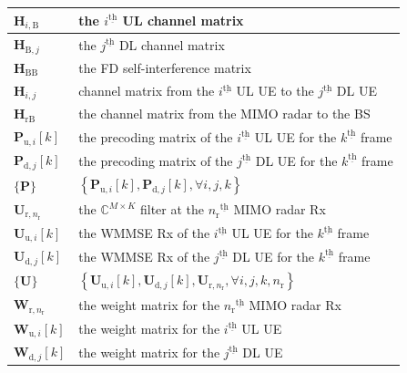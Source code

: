 \documentclass[10pt,journal]{IEEEtran}
\newcommand{\bracket}[1]{{\left [{#1}\right ]}}
\newcommand{\braces}[1]{{\left\{ {#1}\right\}}}
\newcommand{\ith}[1]    {{#1}^{\underline{\text{th}}}}
\newcommand{\rr}{_\mathrm{r}}
\newcommand{\rnr}{_{\mathrm{r},n_\mathrm{r}}}
\newcommand{\MM}{\mathit{M}}
\newcommand{\PiB}{\mathbf{P}_{\textrm{u},i}\bracket{k}}
\newcommand{\PBj}{\mathbf{P}_{\textrm{d},j}\bracket{k}}
\newcommand{\UiB}{\mathbf{U}_{\textrm{u},i}\bracket{k}}
\newcommand{\WiB}{\mathbf{W}_{\textrm{u},i}\bracket{k}}
\newcommand{\UBj}{\mathbf{U}_{\textrm{d},j}\bracket{k}}
\newcommand{\WBj}{\mathbf{W}_{\mathrm{d},j}\bracket{k}}
\newcommand{\Wrnr}{\mathbf{W}_{\mathrm{r},n_\mathrm{r}}}
\newcommand{\HrB}{\mathbf{H}_{\textrm{rB}}}
\newcommand{\HBj}{\mathbf{H}_{\textrm{B},j}}
\newcommand{\HBB}{\mathbf{H}_{\mathrm{BB}}}
\newcommand{\HiB}{\mathbf{H}_{i,\textrm{B}}}
\newcommand{\Hij}{\mathbf{H}_{i,j}}
\theoremstyle{definition}
\begin{document}
\begin{table}[!t]
\begin{tabular}{l||p{66mm}}
			\hline
			$\HiB$& the $\ith{i}$ UL channel matrix\\
			\hline
			$\HBj$& the $\ith{j}$ DL channel matrix\\
			\hline
			$\HBB$& the FD self-interference matrix\\
			\hline
			$\Hij$& channel matrix from the $\ith{i}$ UL UE to the $\ith{j}$ DL UE\\
			\hline
			$\HrB$& the channel matrix from the MIMO radar to the BS\\
			\hline
			$\PiB$& the precoding matrix of the $\ith{i}$ UL UE for the $\ith{k}$ frame\\
			\hline
			$\PBj$& the precoding matrix of the $\ith{j}$ DL UE for the $\ith{k}$ frame\\
			\hline
			$\{\mathbf{P}\}$& $\braces{\PiB,\PBj,\forall i,j,k}$\\
			\hline
			$\mathbf{U}_{\mathrm{r},n\rr}$& the $\mathbb{C}^{\MM\times\mathrm{\mathit{K}}}$ filter at the $\ith{n\rr}$ MIMO radar Rx\\
			\hline
			$\UiB$& the WMMSE Rx of the $\ith{i}$ UL UE for the $\ith{k}$ frame\\
			\hline
			$\UBj$& the WMMSE Rx of the $\ith{j}$ DL UE for the $\ith{k}$ frame\\
			\hline
			$\{\mathbf{U}\}$& $\braces{\UiB, \UBj, \mathbf{U}\rnr, \forall i,j,k,n\rr}$\\
			\hline
			$\Wrnr$& the weight matrix for the $\ith{n\rr}$ MIMO radar Rx\\
			\hline
			$\WiB$& the weight matrix for the $\ith{i}$ UL UE\\
			\hline
			$\WBj$& the weight matrix for the $\ith{j}$ DL UE\\
			\hline
		\end{tabular}
	\end{table}
	\color{black}
\end{document}
